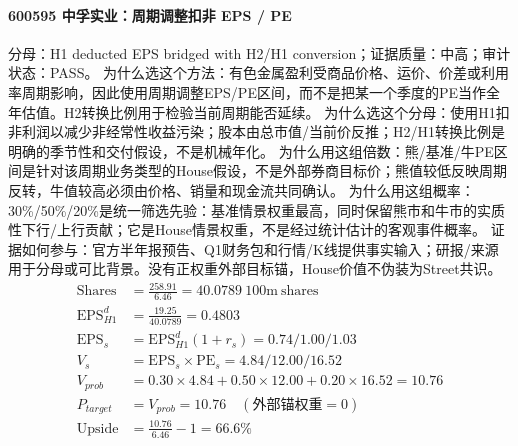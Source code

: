 \paragraph{600595 中孚实业：周期调整扣非 EPS / PE}
分母：H1 deducted EPS bridged with H2/H1 conversion；证据质量：中高；审计状态：PASS。
为什么选这个方法：有色金属盈利受商品价格、运价、价差或利用率周期影响，因此使用周期调整EPS/PE区间，而不是把某一个季度的PE当作全年估值。H2转换比例用于检验当前周期能否延续。
为什么选这个分母：使用H1扣非利润以减少非经常性收益污染；股本由总市值/当前价反推；H2/H1转换比例是明确的季节性和交付假设，不是机械年化。
为什么用这组倍数：熊/基准/牛PE区间是针对该周期业务类型的House假设，不是外部券商目标价；熊值较低反映周期反转，牛值较高必须由价格、销量和现金流共同确认。
为什么用这组概率：30\%/50\%/20\%是统一筛选先验：基准情景权重最高，同时保留熊市和牛市的实质性下行/上行贡献；它是House情景权重，不是经过统计估计的客观事件概率。
证据如何参与：官方半年报预告、Q1财务包和行情/K线提供事实输入；研报/来源用于分母或可比背景。没有正权重外部目标锚，House价值不伪装为Street共识。
\begin{align*}
\mathrm{Shares} &= \frac{258.91}{6.46}=40.0789\ \mathrm{100m\ shares}\\
\mathrm{EPS}_{H1}^d &= \frac{19.25}{40.0789}=0.4803\\
\mathrm{EPS}_s &= \mathrm{EPS}_{H1}^d(1+r_s)=0.74/1.00/1.03\\
V_s &= \mathrm{EPS}_s\times \mathrm{PE}_s=4.84/12.00/16.52\\
V_{prob} &= 0.30\times 4.84+0.50\times 12.00+0.20\times 16.52=10.76\\
P_{target} &= V_{prob}=10.76\quad(\text{外部锚权重}=0)\\
\mathrm{Upside} &= \frac{10.76}{6.46}-1=66.6\%\\
\end{align*}

